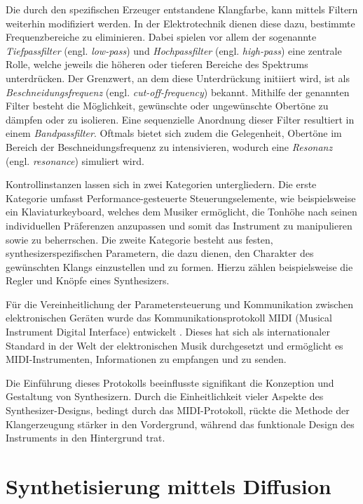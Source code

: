 \documentclass[
  a4paper,  %
  twoside,  %
  bibliography=totoc,
  headsepline,
  cleardoublepage=empty,
  parskip=half,
  draft=false
]{scrbook}
\begin{document}
Die durch den spezifischen Erzeuger entstandene Klangfarbe, kann mittels Filtern weiterhin modifiziert werden. In der Elektrotechnik dienen diese dazu, bestimmte Frequenzbereiche zu eliminieren. Dabei spielen vor allem der sogenannte \emph{Tiefpassfilter} (engl. \emph{low-pass}) und \emph{Hochpassfilter} (engl. \emph{high-pass}) eine zentrale Rolle, welche jeweils die höheren oder tieferen Bereiche des Spektrums unterdrücken. Der Grenzwert, an dem diese Unterdrückung initiiert wird, ist als \emph{Beschneidungsfrequenz} (engl. \emph{cut-off-frequency}) bekannt. Mithilfe der genannten Filter besteht die Möglichkeit, gewünschte oder ungewünschte Obertöne zu dämpfen oder zu isolieren. Eine sequenzielle Anordnung dieser Filter resultiert in einem \emph{Bandpassfilter}. Oftmals bietet sich zudem die Gelegenheit, Obertöne im Bereich der Beschneidungsfrequenz zu intensivieren, wodurch eine \emph{Resonanz} (engl. \emph{resonance}) simuliert wird. \cite{ruschkowski_elektronische_2019}

Kontrollinstanzen lassen sich in zwei Kategorien untergliedern. Die erste Kategorie umfasst Performance-gesteuerte Steuerungselemente, wie beispielsweise ein Klaviaturkeyboard, welches dem Musiker ermöglicht, die Tonhöhe nach seinen individuellen Präferenzen anzupassen und somit das Instrument zu manipulieren sowie zu beherrschen. Die zweite Kategorie besteht aus festen, synthesizerspezifischen Parametern, die dazu dienen, den Charakter des gewünschten Klangs einzustellen und zu formen. Hierzu zählen beispielsweise die Regler und Knöpfe eines Synthesizers. \cite{russ_sound_2009}

Für die Vereinheitlichung der Parametersteuerung und Kommunikation zwischen elektronischen Geräten wurde das Kommunikationsprotokoll MIDI (Musical Instrument Digital Interface)\cite{midi_association_midi_nodate} entwickelt . Dieses hat sich als internationaler Standard in der Welt der elektronischen Musik durchgesetzt und ermöglicht es MIDI-Instrumenten, Informationen zu empfangen und zu senden. \cite{ruschkowski_elektronische_2019}

Die Einführung dieses Protokolls beeinflusste signifikant die Konzeption und Gestaltung von Synthesizern. Durch die Einheitlichkeit vieler Aspekte des Synthesizer-Designs, bedingt durch das MIDI-Protokoll, rückte die Methode der Klangerzeugung stärker in den Vordergrund, während das funktionale Design des Instruments in den Hintergrund trat. \cite{russ_sound_2009}

\section{Synthetisierung mittels Diffusion}
\end{document}
